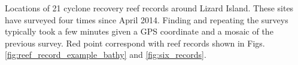 \label{fig:sitemap} Locations of 21 cyclone recovery reef records around Lizard Island. These sites have surveyed four times since April 2014. Finding and repeating the surveys typically took a few minutes given a GPS coordinate and a mosaic of the previous survey. Red point correspond with reef records shown in Figs. \ref{fig:reef_record_example_bathy} and \ref{fig:six_records}.